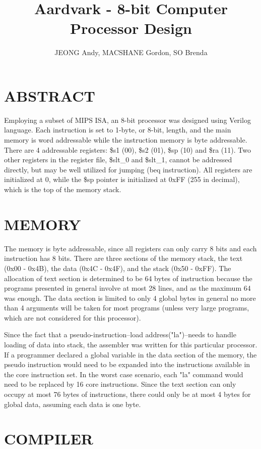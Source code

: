 \documentclass[11pt, titlepage]{article}
\author{JEONG Andy, MACSHANE Gordon, SO Brenda}
\title{Aardvark - 8-bit Computer Processor Design}
\date{\parbox{\linewidth}{}}
\begin{document}
\maketitle
\tableofcontents
\newpage
\setcounter{tocdepth}{1}
\section{ABSTRACT}
Employing a subset of MIPS ISA, an 8-bit processor was designed  using Verilog language. Each instruction is set to 1-byte, or 8-bit, length, and the main memory is word addressable while the instruction memory is byte addressable. There are 4 addressable registers: \$s1 (00), \$s2 (01), \$sp (10) and \$ra (11). Two other registers in the register file, \$slt\_0 and \$slt\_1, cannot be addressed directly, but may be well utilized for jumping (beq instruction). All registers are initialized at 0, while the \$sp pointer is initialized at 0xFF (255 in decimal), which is the top of the memory stack. 
\newpage

\section{MEMORY}
The memory is byte addressable, since all registers can only carry 8 bits and each instruction has 8 bits. There are three sections of the memory stack, the text (0x00 - 0x4B), the data (0x4C - 0x4F), and the stack (0x50 - 0xFF). The allocation of text section is determined to be 64 bytes of instruction because the programs presented in general involve at most 28 lines, and as the maximum 64 was enough. The data section is limited to only 4 global bytes in general no more than 4 arguments will be taken for most programs (unless very large programs, which are not considered for this processor). 

\par Since the fact that a pseudo-instruction--load address("la")--needs to handle loading of data into stack, the assembler was written for this particular processor. If a programmer declared a global variable in the data section of the memory, the pseudo instruction would need to be expanded into the instructions available in the core instruction set. In the worst case scenario, each "la" command would need to be replaced by 16 core instructions. Since the text section can only occupy at most 76 bytes of instructions, there could only be at most 4 bytes for global data, assuming each data is one byte. 

\section{COMPILER}
\end{document}
